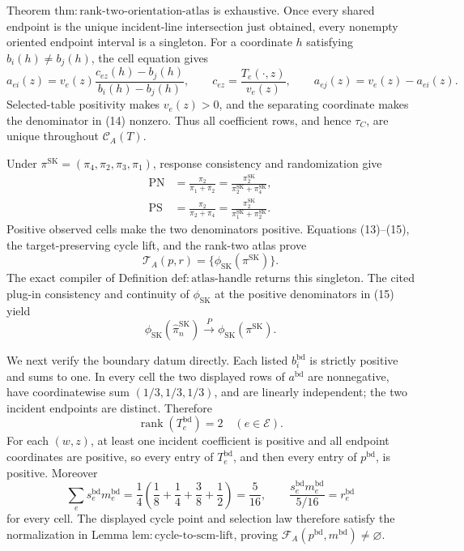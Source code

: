Theorem \(\mathrm{thm{:}rank\text{-}two\text{-}orientation\text{-}atlas}\) is exhaustive.  Once every shared endpoint is the unique incident-line intersection just obtained, every nonempty oriented endpoint interval is a singleton.  For a coordinate \(h\) satisfying \(b_i(h)\ne b_j(h)\), the cell equation gives
\[
 a_{ei}(z)
 =v_e(z)
   \frac{c_{ez}(h)-b_j(h)}{b_i(h)-b_j(h)},
 \qquad
 c_{ez}=\frac{T_e(\cdot,z)}{v_e(z)},
 \qquad
 a_{ej}(z)=v_e(z)-a_{ei}(z).                              \tag{14}
\]
Selected-table positivity makes \(v_e(z)>0\), and the separating coordinate makes the denominator in (14) nonzero.  Thus all coefficient rows, and hence \(\tau_C\), are unique throughout \(\mathcal C_A(T)\).

Under \(\pi^{\mathrm{SK}}=(\pi_4,\pi_2,\pi_3,\pi_1)\), response consistency and randomization give
\[
 \begin{aligned}
 \mathrm{PN}
 &=\frac{\pi_2}{\pi_1+\pi_2}
  =\frac{\pi^{\mathrm{SK}}_2}
          {\pi^{\mathrm{SK}}_2+\pi^{\mathrm{SK}}_4},\\
 \mathrm{PS}
 &=\frac{\pi_2}{\pi_2+\pi_4}
  =\frac{\pi^{\mathrm{SK}}_2}
          {\pi^{\mathrm{SK}}_1+\pi^{\mathrm{SK}}_2}.
 \end{aligned}                                             \tag{15}
\]
Positive observed cells make the two denominators positive.  Equations (13)--(15), the target-preserving cycle lift, and the rank-two atlas prove
\[
 \mathcal T_A(p,r)
 =\{\phi_{\mathrm{SK}}(\pi^{\mathrm{SK}})\}.              \tag{16}
\]
The exact compiler of Definition \(\mathrm{def{:}atlas\text{-}handle}\) returns this singleton.  The cited plug-in consistency and continuity of \(\phi_{\mathrm{SK}}\) at the positive denominators in (15) yield
\[
 \phi_{\mathrm{SK}}(\widehat\pi_n^{\mathrm{SK}})
 \xrightarrow{P}\phi_{\mathrm{SK}}(\pi^{\mathrm{SK}}). \tag{17}
\]

We next verify the boundary datum directly.  Each listed \(b_i^{\mathrm{bd}}\) is strictly positive and sums to one.  In every cell the two displayed rows of \(a^{\mathrm{bd}}\) are nonnegative, have coordinatewise sum \((1/3,1/3,1/3)\), and are linearly independent; the two incident endpoints are distinct.  Therefore
\[
 \operatorname{rank}(T_e^{\mathrm{bd}})=2
 \quad(e\in\mathcal E).                                  \tag{18}
\]
For each \((w,z)\), at least one incident coefficient is positive and all endpoint coordinates are positive, so every entry of \(T_e^{\mathrm{bd}}\), and then every entry of \(p^{\mathrm{bd}}\), is positive.  Moreover
\[
 \sum_e s_e^{\mathrm{bd}}m_e^{\mathrm{bd}}
 =\frac14\left(\frac18+\frac14+\frac38+\frac12\right)
 =\frac5{16},
 \qquad
 \frac{s_e^{\mathrm{bd}}m_e^{\mathrm{bd}}}{5/16}
 =r_e^{\mathrm{bd}}                                      \tag{19}
\]
for every cell.  The displayed cycle point and selection law therefore satisfy the normalization in Lemma \(\mathrm{lem{:}cycle\text{-}to\text{-}scm\text{-}lift}\), proving
\(\mathcal F_A(p^{\mathrm{bd}},m^{\mathrm{bd}})\ne\varnothing\).

